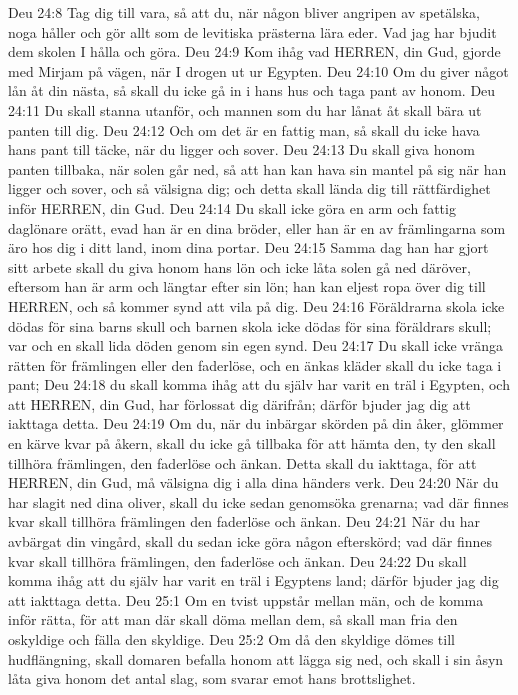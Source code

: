 Deu 24:8  Tag dig till vara, så att du, när någon bliver angripen av spetälska, noga håller och gör allt som de levitiska prästerna lära eder. Vad jag har bjudit dem skolen I hålla och göra.
Deu 24:9  Kom ihåg vad HERREN, din Gud, gjorde med Mirjam på vägen, när I drogen ut ur Egypten.
Deu 24:10  Om du giver något lån åt din nästa, så skall du icke gå in i hans hus och taga pant av honom.
Deu 24:11  Du skall stanna utanför, och mannen som du har lånat åt skall bära ut panten till dig.
Deu 24:12  Och om det är en fattig man, så skall du icke hava hans pant till täcke, när du ligger och sover.
Deu 24:13  Du skall giva honom panten tillbaka, när solen går ned, så att han kan hava sin mantel på sig när han ligger och sover, och så välsigna dig; och detta skall lända dig till rättfärdighet inför HERREN, din Gud.
Deu 24:14  Du skall icke göra en arm och fattig daglönare orätt, evad han är en dina bröder, eller han är en av främlingarna som äro hos dig i ditt land, inom dina portar.
Deu 24:15  Samma dag han har gjort sitt arbete skall du giva honom hans lön och icke låta solen gå ned däröver, eftersom han är arm och längtar efter sin lön; han kan eljest ropa över dig till HERREN, och så kommer synd att vila på dig.
Deu 24:16  Föräldrarna skola icke dödas för sina barns skull och barnen skola icke dödas för sina föräldrars skull; var och en skall lida döden genom sin egen synd.
Deu 24:17  Du skall icke vränga rätten för främlingen eller den faderlöse, och en änkas kläder skall du icke taga i pant;
Deu 24:18  du skall komma ihåg att du själv har varit en träl i Egypten, och att HERREN, din Gud, har förlossat dig därifrån; därför bjuder jag dig att iakttaga detta.
Deu 24:19  Om du, när du inbärgar skörden på din åker, glömmer en kärve kvar på åkern, skall du icke gå tillbaka för att hämta den, ty den skall tillhöra främlingen, den faderlöse och änkan. Detta skall du iakttaga, för att HERREN, din Gud, må välsigna dig i alla dina händers verk.
Deu 24:20  När du har slagit ned dina oliver, skall du icke sedan genomsöka grenarna; vad där finnes kvar skall tillhöra främlingen den faderlöse och änkan.
Deu 24:21  När du har avbärgat din vingård, skall du sedan icke göra någon efterskörd; vad där finnes kvar skall tillhöra främlingen, den faderlöse och änkan.
Deu 24:22  Du skall komma ihåg att du själv har varit en träl i Egyptens land; därför bjuder jag dig att iakttaga detta.
Deu 25:1  Om en tvist uppstår mellan män, och de komma inför rätta, för att man där skall döma mellan dem, så skall man fria den oskyldige och fälla den skyldige.
Deu 25:2  Om då den skyldige dömes till hudflängning, skall domaren befalla honom att lägga sig ned, och skall i sin åsyn låta giva honom det antal slag, som svarar emot hans brottslighet.

